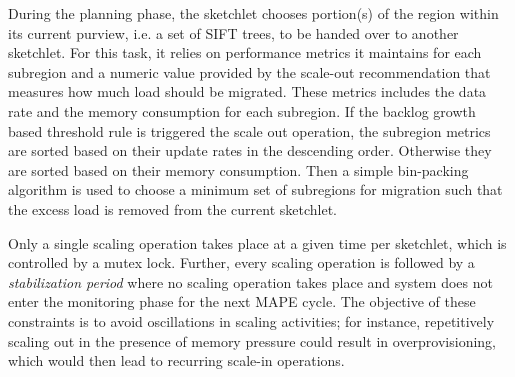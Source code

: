 During the planning phase, the sketchlet chooses portion(s) of the region within its current purview, i.e. a set of SIFT trees, to be handed over to another sketchlet.
For this task, it relies on performance metrics it maintains for each subregion and a numeric value provided by the scale-out recommendation that measures how much load should be migrated.
These metrics includes the data rate and the memory consumption for each subregion.
If the backlog growth based threshold rule is triggered the scale out operation, the subregion metrics are sorted based on their update rates in the descending order. Otherwise they are sorted based on their memory consumption.
Then a simple bin-packing algorithm is used to choose a minimum set of subregions for migration such that the excess load is removed from the current sketchlet.

Only a single scaling operation takes place at a given time per sketchlet, which is controlled by a mutex lock.
Further, every scaling operation is followed by a \textit{stabilization period} where no scaling operation takes place and system does not enter the monitoring phase for the next MAPE cycle.
The objective of these constraints is to avoid oscillations in scaling activities; for instance, repetitively scaling out in the presence of memory pressure could result in overprovisioning, which would then lead to recurring scale-in operations.
%

